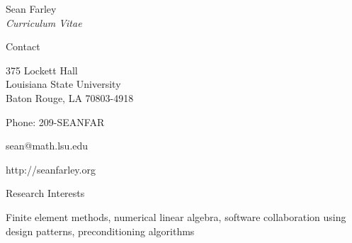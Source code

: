 \documentclass[10pt]{article}
\begin{document}
% 

\newlength{\oldcvlabelwidth}
\renewcommand*{\cvbibname}{}
\newcommand{\name}{Sean Farley}
\newcommand{\institute}{Louisiana State University}
\newcommand{\dept}{Department of Mathematics}

\begin{cv}{\name\\{\large \itshape Curriculum Vitae}}

\begin{cvlist}{Contact}
	\item
	375 Lockett Hall\\
	\institute\\
	Baton Rouge, LA 70803-4918
	\item Phone: 209-SEANFAR
	\item sean@math.lsu.edu
	\item http://seanfarley.org
\end{cvlist}

\begin{cvlist}{Research Interests}
	\item Finite element methods, numerical linear algebra, software collaboration using design patterns, preconditioning algorithms
\end{cvlist}


\end{cv}
\end{document}

